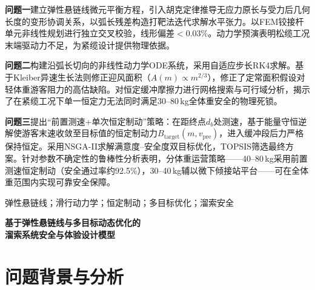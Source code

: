 \documentclass[12pt,a4paper]{ctexart}
\begin{document}
\textbf{问题一}建立弹性悬链线微元平衡方程，引入胡克定律推导无应力原长与受力后几何长度的变形协调关系，以弧长残差构造打靶法迭代求解水平张力。以FEM铰接杆单元非线性规划进行独立交叉校验，线形偏差$<0.03\%$。动力学预演表明松缆工况末端驱动力不足，为紧缆设计提供物理依据。

\textbf{问题二}构建沿弧长切向的非线性动力学ODE系统，采用自适应步长RK4求解。基于Kleiber异速生长法则修正迎风面积（$A(m)\propto m^{2/3}$），修正了定常面积假设对轻体重游客阻力的高估缺陷。对恒定缓冲摩擦力进行网格搜索与可行域分析，揭示了在紧缆工况下单一恒定力无法同时满足30--80\,kg全体重安全的物理死锁。

\textbf{问题三}提出``前置测速+单次恒定制动''策略：在距终点$d_b$处测速，基于能量守恒逆解使游客末速收敛至目标值的恒定制动力$B_{\text{target}}(m,v_{\text{pre}})$，进入缓冲段后力严格保持恒定。采用NSGA-II求解满意度--安全度双目标优化，TOPSIS筛选最终方案。针对参数不确定性的鲁棒性分析表明，分体重运营策略——40--80\,kg采用前置测速恒定制动（安全通过率约92.5\%），30--40\,kg辅以微下倾接站平台——可在全体重范围内实现可靠安全保障。

\vspace{1cm}


\vspace{0.4cm}

\noindent 弹性悬链线；滑行动力学；恒定制动；多目标优化；溜索安全

\newpage

\thispagestyle{empty}
\tableofcontents
\newpage

\setcounter{page}{1}

\begin{center}
  {\LARGE\bfseries 基于弹性悬链线与多目标动态优化的\\[6pt]溜索系统安全与体验设计模型}
\end{center}

\vspace{0.6cm}

\section{问题背景与分析}
\end{document}
